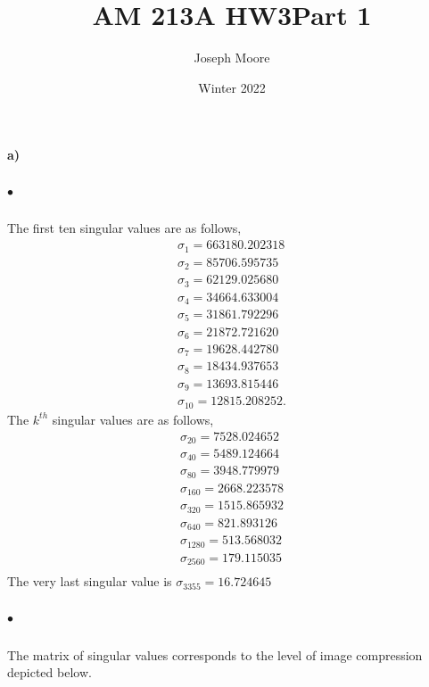 \documentclass[12pt]{article}
\title{AM 213A HW3}
\author{Joseph Moore}
\date{Winter 2022}
\begin{document}
\maketitle

\title{\textbf{Part 1}}
 
\paragraph{a)}
	\subparagraph{$\bullet$}
		The first ten singular values are as follows,
		\[\begin{matrix}
		\sigma_1 = 663180.202318 \\
		\sigma_2 = 85706.595735 \\
		\sigma_3 = 62129.025680 \\
		\sigma_4 = 34664.633004 \\
		\sigma_5 = 31861.792296 \\
		\sigma_6 = 21872.721620 \\
		\sigma_7 = 19628.442780 \\
		\sigma_8 = 18434.937653 \\
		\sigma_9 = 13693.815446 \\
		\sigma_{10} = 12815.208252.
		\end{matrix}	
		\]
		The $k^{th}$ singular values are as follows,
		\[\begin{matrix}
		\sigma_{20} = 7528.024652  \\
		\sigma_{40} = 5489.124664  \\
		\sigma_{80} = 3948.779979  \\
		\sigma_{160} = 2668.223578 \\
		\sigma_{320} = 1515.865932 \\
		\sigma_{640} = 821.893126  \\
		\sigma_{1280} = 513.568032 \\
		\sigma_{2560} = 179.115035 \\
		\end{matrix}	
		\]
		The very last singular value is $\sigma_{3355} = 16.724645$

\newpage	
	\subparagraph{$\bullet$}
		The matrix of singular values corresponds to the level of image compression depicted below.\\
	
\end{document}
